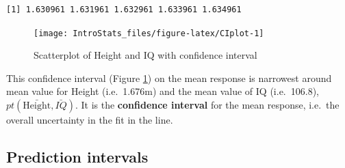 \documentclass[
  oneside]{krantz}
\newenvironment{Shaded}{\begin{snugshade}}{\end{snugshade}}
\newcommand{\AttributeTok}[1]{\textcolor[rgb]{0.77,0.63,0.00}{#1}}
\newcommand{\CommentTok}[1]{\textcolor[rgb]{0.56,0.35,0.01}{\textit{#1}}}
\newcommand{\DecValTok}[1]{\textcolor[rgb]{0.00,0.00,0.81}{#1}}
\newcommand{\FloatTok}[1]{\textcolor[rgb]{0.00,0.00,0.81}{#1}}
\newcommand{\FunctionTok}[1]{\textcolor[rgb]{0.00,0.00,0.00}{#1}}
\newcommand{\NormalTok}[1]{#1}
\newcommand{\OtherTok}[1]{\textcolor[rgb]{0.56,0.35,0.01}{#1}}
\newcommand{\SpecialCharTok}[1]{\textcolor[rgb]{0.00,0.00,0.00}{#1}}
\newcommand{\StringTok}[1]{\textcolor[rgb]{0.31,0.60,0.02}{#1}}
\begin{document}
\begin{verbatim}
[1] 1.630961 1.631961 1.632961 1.633961 1.634961
\end{verbatim}

\begin{Shaded}
\end{Shaded}

\begin{figure}

{\centering \texttt{[image: IntroStats\_files/figure-latex/CIplot-1]} 

}

\caption{Scatterplot of Height and IQ with confidence interval}\label{fig:CIplot}
\end{figure}

This confidence interval (Figure \ref{fig:CIplot}) on the mean response is narrowest around mean value for Height (i.e.~1.676m) and the mean value of IQ (i.e.~106.8), \(pt(\bar{\mathrm{Height}},\bar{IQ})\). It is the \textbf{confidence interval} for the mean response, i.e.~the overall uncertainty in the fit in the line.

\hypertarget{prediction-intervals}{%
\subsection{Prediction intervals}\label{prediction-intervals}}
\end{document}
